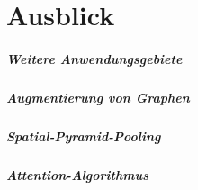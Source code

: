 \chapter{Ausblick}
\label{ausblick}

\paragraph{Weitere Anwendungsgebiete}
\label{weitere_anwendungsgebiete}

\paragraph{Augmentierung von Graphen}
\label{augmentierung_von_graphen}

\paragraph{Spatial-Pyramid-Pooling}
\label{spatial_pyramid_pooling}

\paragraph{Attention-Algorithmus}
\label{attention_algorithmus}
